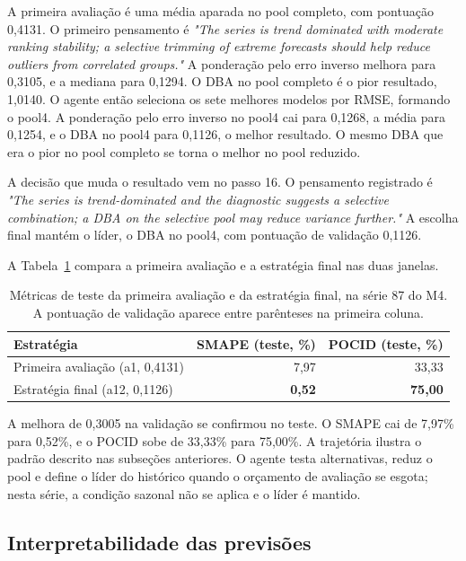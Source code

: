 A primeira avaliação é uma média aparada no pool completo, com pontuação 0,4131. O primeiro pensamento é \textit{"The series is trend dominated with moderate ranking stability; a selective trimming of extreme forecasts should help reduce outliers from correlated groups."} A ponderação pelo erro inverso melhora para 0,3105, e a mediana para 0,1294. O DBA no pool completo é o pior resultado, 1,0140. O agente então seleciona os sete melhores modelos por RMSE, formando o pool4. A ponderação pelo erro inverso no pool4 cai para 0,1268, a média para 0,1254, e o DBA no pool4 para 0,1126, o melhor resultado. O mesmo DBA que era o pior no pool completo se torna o melhor no pool reduzido.

A decisão que muda o resultado vem no passo 16. O pensamento registrado é \textit{"The series is trend-dominated and the diagnostic suggests a selective combination; a DBA on the selective pool may reduce variance further."} A escolha final mantém o líder, o DBA no pool4, com pontuação de validação 0,1126.

A Tabela~\ref{tab:transcricao-validacao-teste} compara a primeira avaliação e a estratégia final nas duas janelas.

\begin{table}[H]
\centering
\caption[Métricas de teste na série 87 do M4.]{Métricas de teste da primeira avaliação e da estratégia final, na série 87 do M4. A pontuação de validação aparece entre parênteses na primeira coluna.}
\label{tab:transcricao-validacao-teste}
\small
\setlength{\tabcolsep}{4pt}
\begin{tabular}{@{}lrr@{}}
\toprule
\textbf{Estratégia} & \textbf{SMAPE (teste, \%)} & \textbf{POCID (teste, \%)} \\
\midrule
Primeira avaliação (a1, 0,4131) & 7,97 & 33,33 \\
Estratégia final (a12, 0,1126) & \textbf{0,52} & \textbf{75,00} \\
\bottomrule
\end{tabular}
\end{table}

A melhora de 0,3005 na validação se confirmou no teste. O SMAPE cai de 7,97\% para 0,52\%, e o POCID sobe de 33,33\% para 75,00\%. A trajetória ilustra o padrão descrito nas subseções anteriores. O agente testa alternativas, reduz o pool e define o líder do histórico quando o orçamento de avaliação se esgota; nesta série, a condição sazonal não se aplica e o líder é mantido.
\subsection{Interpretabilidade das previsões} \label{subsec:interpretabilidade-previsoes}

